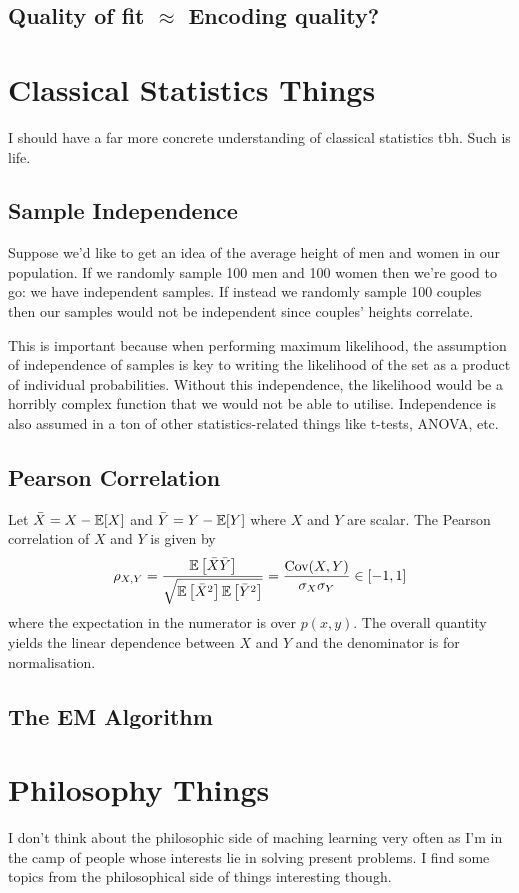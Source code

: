 \documentclass[11pt]{article}
\begin{document}
\begin{appendices}
\subsection{Quality of fit $\approx$ Encoding quality?}
\TODO{}

\section{Classical Statistics Things}
I should have a far more concrete understanding of classical statistics tbh. Such is life.

\subsection{Sample Independence}
Suppose we'd like to get an idea of the average height of men and women in our population. If we randomly sample 100 men and 100 women then we're good to go: we have independent samples. If instead we randomly sample 100 couples then our samples would not be independent since couples' heights correlate.

This is important because when performing maximum likelihood, the assumption of independence of samples is key to writing the likelihood of the set as a product of individual probabilities. Without this independence, the likelihood would be a horribly complex function that we would not be able to utilise. Independence is also assumed in a ton of other statistics-related things like t-tests, ANOVA, etc.

\subsection{Pearson Correlation}
\label{app:pearson_correlation}
Let $\bar{X}=X-\mathbb{E}[X]$ and $\bar{Y}=Y-\mathbb{E}[Y]$ where $X$ and $Y$ are scalar. The Pearson correlation of $X$ and $Y$ is given by
$$
\rho_{X,Y}
=
\frac{\mathbb{E}\left[\bar{X}\bar{Y}\right]}{\sqrt{\mathbb{E}\left[\bar{X}^2\right]\mathbb{E}\left[\bar{Y}^2\right]}}
=
\frac{\text{Cov}(X,Y)}{\sigma_X\sigma_Y}
\in[-1,1]
$$
where the expectation in the numerator is over $p(x,y)$. The overall quantity yields the linear dependence between $X$ and $Y$ and the denominator is for normalisation.

\subsection{The EM Algorithm}
\TODO{}

\section{Philosophy Things}
I don't think about the philosophic side of maching learning very often as I'm in the camp of people whose interests lie in solving present problems. I find some topics from the philosophical side of things interesting though.


\end{appendices}
\end{document}
